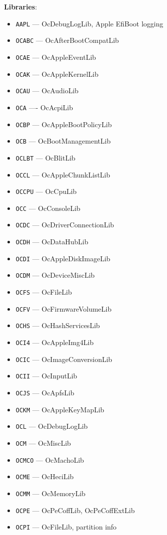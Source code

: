 \documentclass[]{article}
\providecommand{\tightlist}{%
  \setlength{\itemsep}{0pt}\setlength{\parskip}{0pt}}
\begin{document}
\begin{enumerate}
  \textbf{Libraries}:
  \begin{itemize}
  \tightlist
  \item \texttt{AAPL} --- OcDebugLogLib, Apple EfiBoot logging
  \item \texttt{OCABC} --- OcAfterBootCompatLib
  \item \texttt{OCAE} --- OcAppleEventLib
  \item \texttt{OCAK} --- OcAppleKernelLib
  \item \texttt{OCAU} --- OcAudioLib
  \item \texttt{OCA} ---- OcAcpiLib
  \item \texttt{OCBP} --- OcAppleBootPolicyLib
  \item \texttt{OCB} --- OcBootManagementLib
  \item \texttt{OCLBT} --- OcBlitLib
  \item \texttt{OCCL} --- OcAppleChunkListLib
  \item \texttt{OCCPU} --- OcCpuLib
  \item \texttt{OCC} --- OcConsoleLib
  \item \texttt{OCDC} --- OcDriverConnectionLib
  \item \texttt{OCDH} --- OcDataHubLib
  \item \texttt{OCDI} --- OcAppleDiskImageLib
  \item \texttt{OCDM} --- OcDeviceMiscLib
  \item \texttt{OCFS} --- OcFileLib
  \item \texttt{OCFV} --- OcFirmwareVolumeLib
  \item \texttt{OCHS} --- OcHashServicesLib
  \item \texttt{OCI4} --- OcAppleImg4Lib
  \item \texttt{OCIC} --- OcImageConversionLib
  \item \texttt{OCII} --- OcInputLib
  \item \texttt{OCJS} --- OcApfsLib
  \item \texttt{OCKM} --- OcAppleKeyMapLib
  \item \texttt{OCL} --- OcDebugLogLib
  \item \texttt{OCM} --- OcMiscLib
  \item \texttt{OCMCO} --- OcMachoLib
  \item \texttt{OCME} --- OcHeciLib
  \item \texttt{OCMM} --- OcMemoryLib
  \item \texttt{OCPE} --- OcPeCoffLib, OcPeCoffExtLib
  \item \texttt{OCPI} --- OcFileLib, partition info

\end{itemize}
\end{enumerate}
\end{document}
